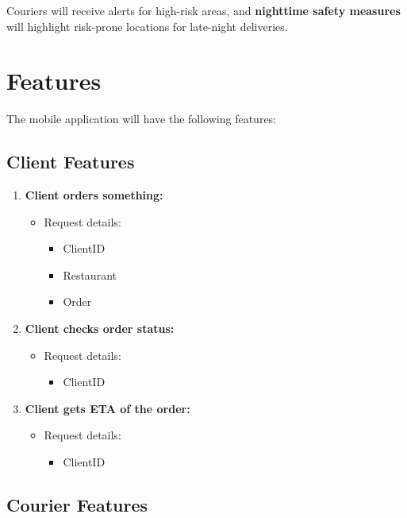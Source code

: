 \documentclass[a4paper,twoside,11pt]{article}
\begin{document}
Couriers will receive alerts for high-risk areas, and \textbf{nighttime safety measures} will highlight risk-prone locations for late-night deliveries.

\newpage 

\section{Features}
The mobile application will have the following features:
\subsection{Client Features}

\begin{enumerate}
    \item \textbf{Client orders something:}
    \begin{itemize}
        \item Request details:
        \begin{itemize}
            \item ClientID 
            \item Restaurant
            \item Order
        \end{itemize}
    \end{itemize}

    \item \textbf{Client checks order status:}
    \begin{itemize}
        \item Request details:
        \begin{itemize}
            \item ClientID
        \end{itemize}
    \end{itemize}

    \item \textbf{Client gets ETA of the order:}
    \begin{itemize}
        \item Request details:
        \begin{itemize}
            \item ClientID 
        \end{itemize}
    \end{itemize}
\end{enumerate}

\subsection{Courier Features}
\end{document}
